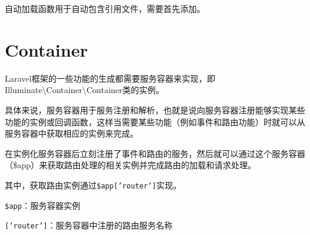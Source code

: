 自动加载函数用于自动包含引用文件，需要首先添加。



\section{Container}

Laravel框架的一些功能的生成都需要服务容器来实现，即Illuminate\textbackslash Container\textbackslash Container类的实例。

具体来说，服务容器用于服务注册和解析，也就是说向服务容器注册能够实现某些功能的实例或回调函数，这样当需要某些功能（例如事件和路由功能）时就可以从服务容器中获取相应的实例来完成。

在实例化服务容器后立刻注册了事件和路由的服务，然后就可以通过这个服务容器（\$app）来获取路由处理的相关实例并完成路由的加载和请求处理。

其中，获取路由实例通过\texttt{\$app['router']}实现。

\begin{compactitem}
\item \texttt{\$app}：服务容器实例
\item \texttt{['router']}：服务容器中注册的路由服务名称
\end{compactitem}






